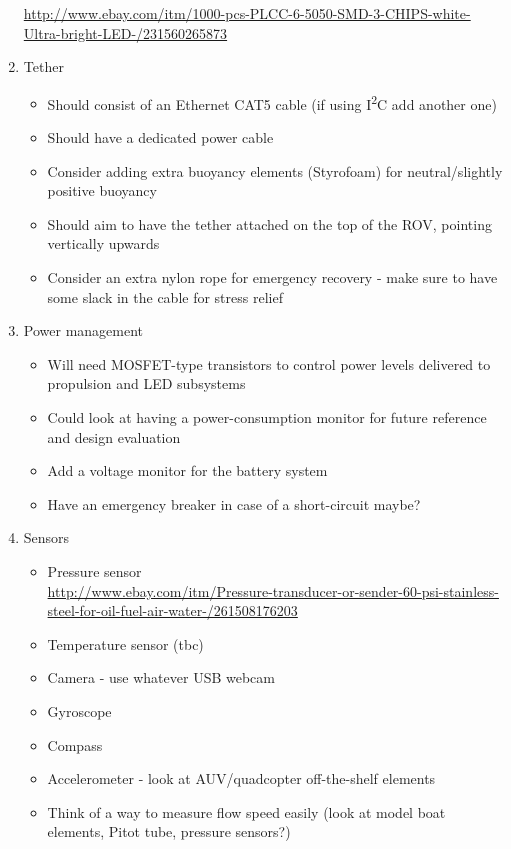 \documentclass[11pt,a4paper,oneside]{report}
\begin{document}
\begin{enumerate}
	\url{http://www.ebay.com/itm/1000-pcs-PLCC-6-5050-SMD-3-CHIPS-white-Ultra-bright-LED-/231560265873}
\item Tether
	\begin{itemize}
	\item Should consist of an Ethernet CAT5 cable (if using I\textsuperscript{2}C add another one)
	\item Should have a dedicated power cable
	\item Consider adding extra buoyancy elements (Styrofoam) for neutral/slightly positive buoyancy
	\item Should aim to have the tether attached on the top of the ROV, pointing vertically upwards
	\item Consider an extra nylon rope for emergency recovery - make sure to have some slack in the cable
		for stress relief
	\end{itemize}
\item Power management
	\begin{itemize}
	\item Will need MOSFET-type transistors to control power levels delivered to propulsion
		and LED subsystems
	\item Could look at having a power-consumption monitor for future reference and
		design evaluation
	\item Add a voltage monitor for the battery system
	\item Have an emergency breaker in case of a short-circuit maybe?
	\end{itemize}
\item Sensors
	\begin{itemize}
	\item Pressure sensor \\
		\url{http://www.ebay.com/itm/Pressure-transducer-or-sender-60-psi-stainless-steel-for-oil-fuel-air-water-/261508176203}
	\item Temperature sensor (tbc)
	\item Camera - use whatever USB webcam
	\item Gyroscope
	\item Compass
	\item Accelerometer - look at AUV/quadcopter off-the-shelf elements
	\item Think of a way to measure flow speed easily (look at model boat elements,
		Pitot tube, pressure sensors?)
	\end{itemize}
\end{enumerate}
\end{document}
